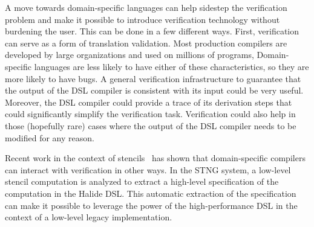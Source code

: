 A move towards domain-specific languages can help sidestep the verification problem and make it possible to introduce verification technology without burdening the user. This can be done in a few different ways. First, verification can serve as a form of translation validation. Most production compilers are developed by large organizations and used on millions of programs,
%
%
Domain-specific languages are less likely to have either of these characteristics, so they are more likely to have bugs. A general verification infrastructure to guarantee that the output of the DSL compiler is consistent with its input could be very useful. Moreover, the DSL compiler could provide a trace of its derivation steps that could significantly simplify the verification task. 
%
Verification could also help in those (hopefully rare) cases where the output of the DSL compiler needs to be modified for any reason.


 

Recent work in the context of stencils~\cite{Kamil:2016:VLS:2908080.2908117} has shown that domain-specific compilers can interact with verification in other ways. In the STNG system, a low-level stencil computation is analyzed to extract a high-level specification of the computation in the Halide DSL. This automatic extraction of the specification can make it possible to leverage the power of the high-performance DSL in the context of a low-level legacy implementation. 

